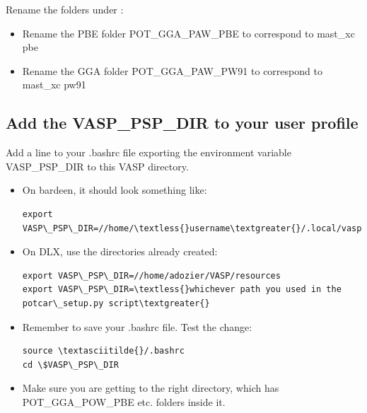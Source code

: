 \documentclass[letterpaper,10pt,english]{sphinxmanual}
\begin{document}
Rename the folders under :
\begin{itemize}
\item {} 
Rename the PBE folder POT\_GGA\_PAW\_PBE to correspond to mast\_xc pbe

\item {} 
Rename the GGA folder POT\_GGA\_PAW\_PW91 to correspond to mast\_xc pw91

\end{itemize}


\subsection{Add the VASP\_PSP\_DIR to your user profile}
\label{1_0_installation:add-the-vasp-psp-dir-to-your-user-profile}
Add a line to your .bashrc file exporting the environment variable VASP\_PSP\_DIR to this VASP directory.
\begin{itemize}
\item {} 
On bardeen, it should look something like:

\begin{Verbatim}[commandchars=\\\{\}]
export VASP\_PSP\_DIR=//home/\textless{}username\textgreater{}/.local/vasp\_pps
\end{Verbatim}

\item {} 
On DLX, use the directories already created:

\begin{Verbatim}[commandchars=\\\{\}]
export VASP\_PSP\_DIR=//home/adozier/VASP/resources
export VASP\_PSP\_DIR=\textless{}whichever path you used in the potcar\_setup.py script\textgreater{}
\end{Verbatim}

\item {} 
Remember to save your .bashrc file. Test the change:

\begin{Verbatim}[commandchars=\\\{\}]
source \textasciitilde{}/.bashrc
cd \$VASP\_PSP\_DIR
\end{Verbatim}

\item {} 
Make sure you are getting to the right directory, which has POT\_GGA\_POW\_PBE etc. folders inside it.

\end{itemize}
\end{document}
